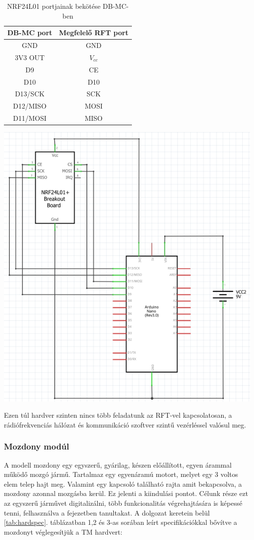 \documentclass[a4paper,12pt]{article}
\begin{document}
\begin{table}[htp]
	\begin{minipage}{0.5\linewidth}
		\centering
		\begin{tabular}{|c|c|}\hline
			DB-MC port & Megfelelő RFT port \\ \hline
			GND & GND \\ \hline
			3V3 OUT & $V_{cc}$ \\ \hline
			D9 & CE \\ \hline
			D10 & D10 \\ \hline
			D13/SCK& SCK \\ \hline
			D12/MISO & MOSI \\ \hline
			D11/MOSI & MISO \\ \hline
		\end{tabular}
	\end{minipage}\hfill
	\begin{minipage}{0.45\linewidth}
		\centering
		\includegraphics[width=0.7\linewidth]{images/RFTDBMCcircuit.png}
	\end{minipage}
	\caption[NRF24L01 bekötése]{NRF24L01 portjainak bekötése DB-MC-ben}
	\label{tab:nrf24l01ports}
\end{table}
Ezen túl hardver szinten nincs több feladatunk az RFT-vel kapcsolatosan, a rádiófrekvenciás hálózat és kommunikáció szoftver szintű vezérléssel valósul meg.

\subsubsection{Mozdony modúl}
A modell mozdony egy egyszerű, gyárilag, készen előállított, egyen árammal működő mozgó jármű. Tartalmaz egy egyenáramú motort, melyet egy 3 voltos elem telep hajt meg.
Valamint egy kapcsoló található rajta amit bekapcsolva, a mozdony azonnal mozgásba kerül.
Ez jelenti a kiindulási pontot. Célunk része ezt az egyszerű járművet digitalizálni, több funkcionalitás végrehajtására is képessé tenni, felhasználva a \textit{} fejezetben tanultakat.
A dolgozat keretein belül \ref{tab:hardspec}. táblázatban 1,2 és 3-as sorában leírt specifikációkkal bővítve a mozdonyt véglegesítjük a TM hardvert:
\end{document}
